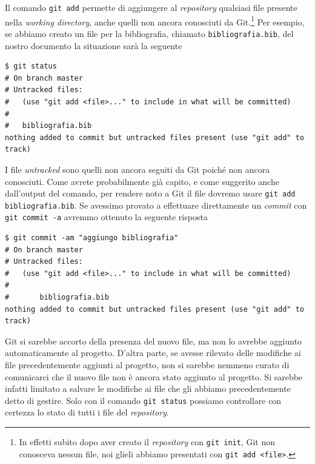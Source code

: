 \documentclass[a4paper,12pt,oneside]{article}
\begin{document}
Il comando \lstinline|git add| permette di aggiungere al \emph{repository}
qualsiasi file presente nella \emph{working directory}, anche quelli non ancora
conosciuti da Git.\footnote{In effetti subito dopo aver creato il
  \emph{repository} con \lstinline|git init|, Git non conosceva nessun file, noi
  glieli abbiamo presentati con \lstinline|git add <file>|.} Per esempio, se
abbiamo creato un file per la bibliografia, chiamato
\lstinline|bibliografia.bib|, del nostro documento la situazione sarà la
seguente
\begin{lstlisting}
$ git status
# On branch master
# Untracked files:
#   (use "git add <file>..." to include in what will be committed)
#
#	bibliografia.bib
nothing added to commit but untracked files present (use "git add" to track)
\end{lstlisting}
I file \emph{untracked} sono quelli non ancora seguiti da Git poiché non ancora
conosciuti. Come avrete probabilmente già capito, e come suggerito anche
dall'output del comando, per rendere noto a Git il file dovremo usare
\lstinline|git add bibliografia.bib|. Se avessimo provato a effettuare
direttamente un \emph{commit} con \lstinline|git commit -a| avremmo ottenuto la
seguente risposta
\begin{lstlisting}
$ git commit -am "aggiungo bibliografia"
# On branch master
# Untracked files:
#   (use "git add <file>..." to include in what will be committed)
#
#       bibliografia.bib
nothing added to commit but untracked files present (use "git add" to track)
\end{lstlisting}
Git si sarebbe accorto della presenza del nuovo file, ma non lo avrebbe aggiunto
automaticamente al progetto. D'altra parte, se avesse rilevato delle modifiche
ai file precedentemente aggiunti al progetto, non si sarebbe nemmeno curato di
comunicarci che il nuovo file non è ancora stato aggiunto al progetto. Si
sarebbe infatti limitato a salvare le modifiche ai file che gli abbiamo
precedentemente detto di gestire. Solo con il comando \lstinline|git status|
possiamo controllare con certezza lo stato di tutti i file del
\emph{repository}.
\end{document}
